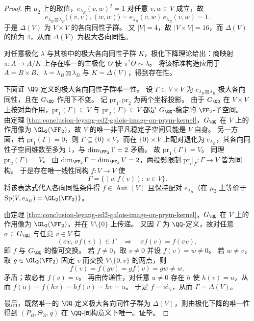 \begin{proof}
由 \(\mu_2\) 上的取值，\(e_{\lambda_B}(v,w)^2=1\) 对任意 \(v,w\in V\) 成立，故
\[
e_{\lambda_B\boxtimes\lambda_B}\bigl((v,v),(w,w)\bigr)
=e_{\lambda_B}(v,w)\,e_{\lambda_B}(v,w)
=1.
\]
于是 \(\Delta(V)\) 为 \(V\times V\) 的各向同性子群。
又 \(|V|=4\)，故 \(|V\times V|=16\)，而 \(\Delta(V)\) 的阶为 \(4\)，从而 \(\Delta(V)\) 为极大各向同性。
\par
对任意极化 \(\lambda\) 与其核中的极大各向同性子群 \(K\)，极化下降理论给出：商映射 \(\pi:A\to A/K\) 上存在唯一的主极化 \(\Theta\) 使 \(\pi^{\ast}\Theta\sim \lambda\)。
将该标准构造应用于 \(A=B\times B\)、\(\lambda=\lambda_B\boxtimes\lambda_B\) 与 \(K=\Delta(V)\)，得到存在性。
\par
下面证 \(\QQ\)-定义的极大各向同性子群唯一性。
设 \(\Gamma\subset V\times V\) 为 \(e_{\lambda_B\boxtimes\lambda_B}\)-极大各向同性，且在 \(G_{\QQ}\) 作用下不变。
记 \(\mathrm{pr}_1,\mathrm{pr}_2\) 为两个坐标投影。
由于 \(G_{\QQ}\) 在 \(V\times V\) 上按对角作用，\(\mathrm{pr}_1(\Gamma)\subseteq V\) 与 \(\mathrm{pr}_2(\Gamma)\subseteq V\) 都是 \(G_{\QQ}\)-稳定的 \(\FF_2\)-子空间。
由定理 \ref{thm:conclusion-leyang-ed2-galois-image-on-prym-kernel}，\(G_{\QQ}\) 在 \(V\) 上的作用像为 \(\GL_2(\FF_2)\)，故 \(V\) 的唯一非平凡稳定子空间只能是 \(V\) 自身。
另一方面，若 \(\mathrm{pr}_1(\Gamma)=0\)，则 \(\Gamma\subseteq \{0\}\times V\)，而在 \(\{0\}\times V\) 上配对退化为 \(e_{\lambda_B}\)，其各向同性子空间维数至多为 \(1\)，与 \(\dim_{\FF_2}\Gamma=2\) 矛盾。
故 \(\mathrm{pr}_1(\Gamma)=V\)。
同理 \(\mathrm{pr}_2(\Gamma)=V\)。
由 \(\dim_{\FF_2}\Gamma=\dim_{\FF_2}V=2\)，两投影限制 \(\mathrm{pr}_i|_{\Gamma}:\Gamma\to V\) 皆为同构。
于是存在唯一线性同构 \(f:V\to V\) 使
\[
\Gamma=\{(v,f(v)):\ v\in V\}.
\]
将该表达式代入各向同性条件得 \(f\in\operatorname{Aut}(V)\) 且保持配对 \(e_{\lambda_B}\)（在 \(\mu_2\) 上等价于 \(\mathrm{Sp}(V,e_{\lambda_B})=\GL_2(\FF_2)\)）。
\par
由定理 \ref{thm:conclusion-leyang-ed2-galois-image-on-prym-kernel}，\(G_{\QQ}\) 在 \(V\) 上的作用像为 \(\GL_2(\FF_2)\)，并在 \(V\setminus\{0\}\) 上传递。
又因 \(\Gamma\) 为 \(\QQ\)-定义，故对任意 \(\sigma\in G_{\QQ}\) 与任意 \(v\in V\) 有
\[
(\sigma v,\,\sigma f(v))\in\Gamma
\quad\Longrightarrow\quad
\sigma f(v)=f(\sigma v),
\]
即 \(f\) 与 \(G_{\QQ}\) 的像可交换。
若 \(f\neq 0\)，取 \(v\neq 0\) 并设 \(f(v)=w\neq 0\)。
若 \(w\neq v\)，取 \(g\in \GL_2(\FF_2)\) 固定 \(v\) 而交换 \(V\setminus\{0,v\}\) 的两点，则
\[
f(v)=f(gv)=g f(v)=g w\neq w,
\]
矛盾；故必有 \(f(v)=v\)。
再由传递性，对任意 \(u\neq 0\) 存在 \(h\) 使 \(h(v)=u\)，从而
\(
f(u)=f(hv)=h f(v)=hv=u
\)。
于是 \(f=\mathrm{id}_V\)，从而 \(\Gamma=\Delta(V)\)。
\par
最后，既然唯一的 \(\QQ\)-定义极大各向同性子群为 \(\Delta(V)\)，则由极化下降的唯一性得到 \((P_B,\Theta_B,q)\) 在 \(\QQ\)-同构意义下唯一。证毕。
\end{proof}

